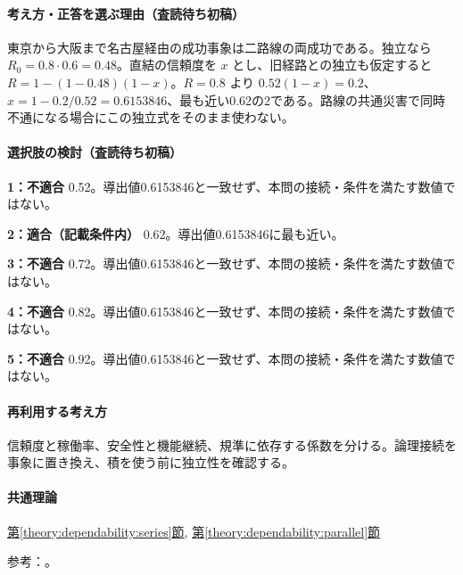 \paragraph{考え方・正答を選ぶ理由（査読待ち初稿）} 東京から大阪まで名古屋経由の成功事象は二路線の両成功である。独立なら \(R_0=0.8\cdot0.6=0.48\)。直結の信頼度を \(x\) とし、旧経路との独立も仮定すると \(R=1-(1-0.48)(1-x)\)。\(R=0.8\) より \(0.52(1-x)=0.2\)、\(x=1-0.2/0.52=0.6153846\)、最も近い0.62の2である。路線の共通災害で同時不通になる場合にこの独立式をそのまま使わない。

\paragraph{選択肢の検討（査読待ち初稿）}\mbox{}\par

\noindent\textbf{1：不適合} 0.52。導出値0.6153846と一致せず、本問の接続・条件を満たす数値ではない。\par

\noindent\textbf{2：適合（記載条件内）} 0.62。導出値0.6153846に最も近い。\par

\noindent\textbf{3：不適合} 0.72。導出値0.6153846と一致せず、本問の接続・条件を満たす数値ではない。\par

\noindent\textbf{4：不適合} 0.82。導出値0.6153846と一致せず、本問の接続・条件を満たす数値ではない。\par

\noindent\textbf{5：不適合} 0.92。導出値0.6153846と一致せず、本問の接続・条件を満たす数値ではない。\par

\paragraph{再利用する考え方} 信頼度と稼働率、安全性と機能継続、規準に依存する係数を分ける。論理接続を事象に置き換え、積を使う前に独立性を確認する。

\paragraph{共通理論} \hyperref[theory:dependability:series]{第\ref*{theory:dependability:series}節}, \hyperref[theory:dependability:parallel]{第\ref*{theory:dependability:parallel}節}

\par 参考：\cite{reliability_nist_series,reliability_nist_parallel}。

